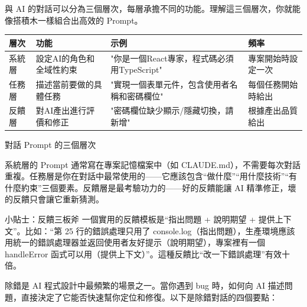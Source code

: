 


與 AI 的對話可以分為三個層次，每層承擔不同的功能。理解這三個層次，你就能像搭積木一樣組合出高效的 Prompt。

\begin{center}
\begin{tabularx}{\linewidth}{|X|X|X|X|}
\hline
\textbf{層次} & \textbf{功能} & \textbf{示例} & \textbf{頻率} \tabularnewline
\hline
系統層 & 設定AI的角色和全域性約束 & "你是一個React專家，程式碼必須用TypeScript" & 專案開始時設定一次 \tabularnewline
任務層 & 描述當前要做的具體任務 & "實現一個表單元件，包含使用者名稱和密碼欄位" & 每個任務開始時給出 \tabularnewline
反饋層 & 對AI產出進行評價和修正 & "密碼欄位缺少顯示/隱藏切換，請新增" & 根據產出品質給出 \tabularnewline
\hline
\end{tabularx}
\end{center}

\begin{center}\small\color{gray}對話 Prompt 的三個層次\end{center}

系統層的 Prompt 通常寫在專案記憶檔案中（如 CLAUDE.md），不需要每次對話重複。任務層是你在對話中最常使用的——它應該包含“做什麼”“用什麼技術”“有什麼約束”三個要素。反饋層是最考驗功力的——好的反饋能讓 AI 精準修正，壞的反饋只會讓它重新猜測。

\begin{tcbinfo}{小貼士：反饋三板斧}
一個實用的反饋模板是“指出問題 + 說明期望 + 提供上下文”。比如：“第 25 行的錯誤處理只用了 console.log（指出問題），生產環境應該用統一的錯誤處理器並返回使用者友好提示（說明期望），專案裡有一個 handleError 函式可以用（提供上下文）”。這種反饋比“改一下錯誤處理”有效十倍。

\end{tcbinfo}


除錯是 AI 程式設計中最頻繁的場景之一。當你遇到 bug 時，如何向 AI 描述問題，直接決定了它能否快速幫你定位和修復。以下是除錯對話的四個要點：


